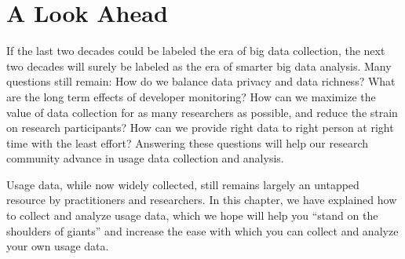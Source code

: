 \section{A Look Ahead}

If the last two decades could be labeled the era
of big data collection,
the next two decades will surely be labeled as the
era of smarter big data analysis.
Many questions still remain:
How do we balance data privacy and data richness?
What are the long term effects of developer monitoring?
How can we maximize the value of data collection
for as many researchers as possible, and reduce the
strain on research participants? How can we provide right data to right person at right time with the least effort?
Answering these questions will help our research
community advance in usage data collection and analysis.

Usage data, while now widely collected, still remains largely
an untapped resource by practitioners and researchers.
In this chapter, we have explained how to collect and
analyze usage data, which we hope will help you ``stand
on the shoulders of giants'' and increase the ease
with which you can collect and analyze your own usage data.


